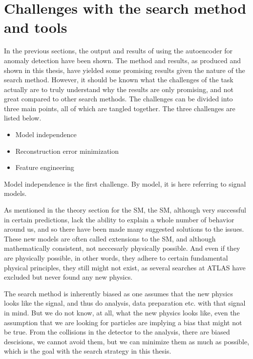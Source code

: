 \section{Challenges with the search method and tools}

In the previous sections, the output and results of using the autoencoder for anomaly detection have been shown. 
The method and results, as produced and shown in this thesis, have yielded some promising results given the nature 
of the search method. However, it should be known what the challenges of the task actually are to truly understand 
why the results are only promising, and not great compared to other search methods. The challenges can be divided into 
three main points, all of which are tangled together. The three challenges are listed below. 

\begin{itemize}
    \item Model independence
    \item Reconstruction error minimization
    \item Feature engineering
\end{itemize}

Model independence is the first challenge. By model, it is here referring to signal models. 

As mentioned in the theory section for the SM, 
the SM, although very successful in certain predictions, lack the ability to explain a whole number of 
behavior around us, and so there have been made many suggested solutions to the issues. These new models are 
often called extensions to the SM, and although mathematically consistent, not neccesarly physically possible. 
And even if they are physically possible, in other words, they adhere to certain fundamental physical principles, they 
still might not exist, as several searches at ATLAS have excluded but never found any new physics. 

The search method is inherently 
biased as one assumes that the new physics looks like the signal, and thus do analysis, data preparation etc. with that 
signal in mind. But we do not know, at all, what the new physics looks like, even the assumption that we are looking for 
particles are implying a bias that might not be true. From the collisions in the detector to the analysis, there are biased descisions, 
we cannot avoid them, but we can minimize them as much as possible, which is the goal with the search strategy in this thesis. \par

